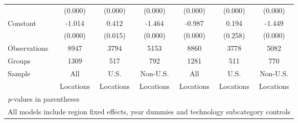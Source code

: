 \begin{table}[htbp]
\begin{tabular}{l*{6}{c}}
                &  (0.000)&  (0.000)&  (0.000)&  (0.000)&  (0.000)&  (0.000)\\
Constant        &   -1.014&    0.412&   -1.464&   -0.987&    0.194&   -1.449\\
                &  (0.000)&  (0.015)&  (0.000)&  (0.000)&  (0.258)&  (0.000)\\
\hline
Observations    &     8947&     3794&     5153&     8860&     3778&     5082\\
Groups          &     1309&      517&      792&     1281&      511&      770\\
Sample&All &U.S. &Non-U.S.&All &U.S. &Non-U.S. \\
          &Locations &Locations&Locations&Locations &Locations&Locations \\
\hline\hline
\multicolumn{7}{l}{\footnotesize \textit{p}-values in parentheses}\\
\multicolumn{7}{l}{\footnotesize All models include region fixed effects, year dummies and technology subcategory controls}\\
\end{tabular}
\end{table}
